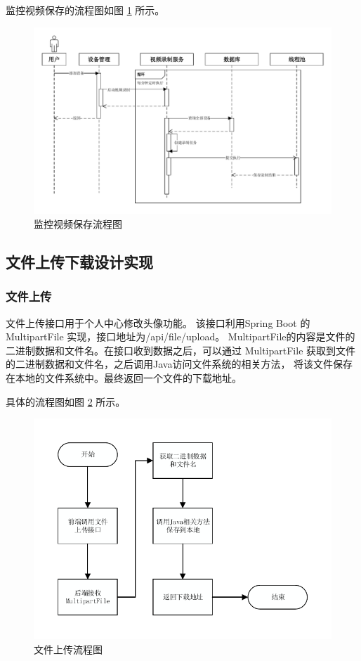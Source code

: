 监控视频保存的流程图如图 \ref{Fig:video_save} 所示。

\begin{figure}[ht]
    \centering
    \includegraphics[width=0.9\linewidth]{./Figure/IMG_video_save.pdf}
    \caption{监控视频保存流程图}\label{Fig:video_save}
\end{figure}

\subsection{文件上传下载设计实现}
\subsubsection{文件上传}
文件上传接口用于个人中心修改头像功能。
该接口利用Spring Boot 的 MultipartFile 实现，接口地址为/api/file/upload。
MultipartFile的内容是文件的二进制数据和文件名。在接口收到数据之后，可以通过 
MultipartFile 获取到文件的二进制数据和文件名，之后调用Java访问文件系统的相关方法，
将该文件保存在本地的文件系统中。最终返回一个文件的下载地址。


具体的流程图如图 \ref{Fig:seq_upload} 所示。

\begin{figure}[ht]
    \centering
    \includegraphics[width=0.7\linewidth]{./Figure/IMG_seq_upload.pdf}
    \caption{文件上传流程图}\label{Fig:seq_upload}
\end{figure}

